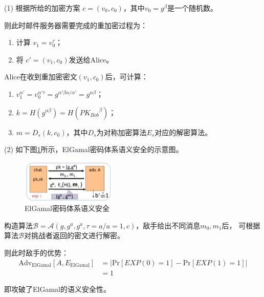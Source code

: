 \begin{Solution}
    (1) 根据所给的加密方案 $c = (v_0, c_0)$，其中$v_0=g^{\beta}$是一个随机数。

    则此时邮件服务器需要完成的重加密过程为：
    \begin{enumerate}
        \item 计算 $v_1 = v_0 ^ \tau$；
        \item 将 $c' = (v_1, c_0)$发送给Alice。
    \end{enumerate}

    Alice在收到重加密密文$(v_1, c_0)$后，可计算：

    \begin{enumerate}
        \item $v_1^{\alpha'} = v_0 ^ {\alpha'\tau} = g^{\alpha'\beta \alpha / \alpha' }
        =g^{\alpha\beta}$；
        \item $k = H(g^{\alpha\beta}) = H({PK_{Bob}}^\beta)$；
        \item $m = D_s(k, c_0)$，其中$D_s$为对称加密算法$E_s$对应的解密算法。
    \end{enumerate}
    
    (2) 如下图\ref{fig:1}所示，ElGamal密码体系语义安全的示意图。
    \begin{figure}[!htbp]
        \centering
        \includegraphics[width=0.4\textwidth]{figures/1.png}
        \caption{ElGamal密码体系语义安全}
        \label{fig:1}
    \end{figure}

    构造算法$\mathcal{B}=\mathcal{A}(g,g^a,g^a,\tau = a/a = 1,c)$，敌手给出不同消息$m_0,m_1$后，
    可根据算法$\mathcal{B}$对挑战者返回的密文进行解密。
    
    则此时敌手的优势：
    \begin{equation}
        \begin{aligned}
            \mathrm{Adv_{ElGamal}}[A, E_{\mathrm{ElGamal}}]    &= |\mathrm{Pr}[EXP(0)=1] - \mathrm{Pr}[EXP(1)=1]|\\
                                        &= 1
        \end{aligned}
    \end{equation}

    即攻破了ElGamal的语义安全性。

\end{Solution}


